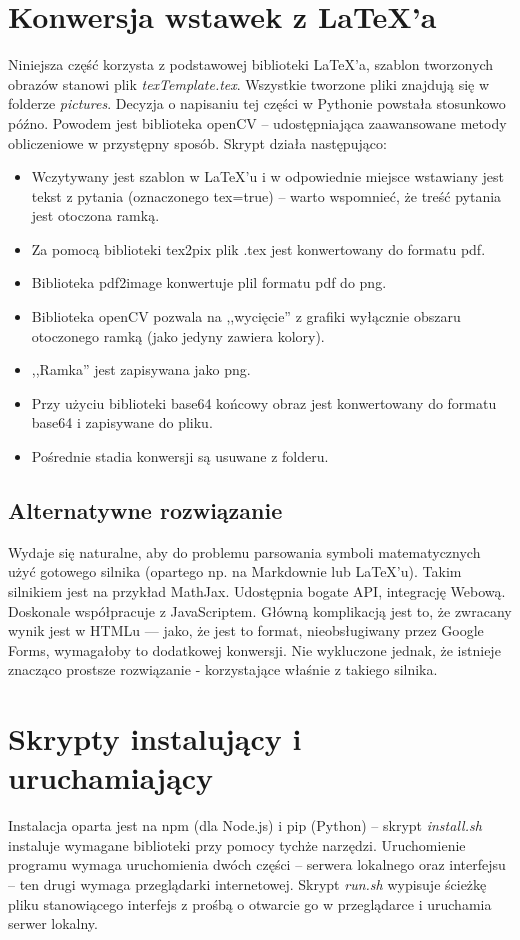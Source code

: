 \section{Konwersja wstawek z \LaTeX{}'a}
Niniejsza część korzysta z podstawowej biblioteki \LaTeX{}'a, szablon tworzonych obrazów stanowi plik \textit{texTemplate.tex}. Wszystkie tworzone pliki znajdują się w folderze \textit{pictures}.
\ind Decyzja o napisaniu tej części w Pythonie powstała stosunkowo późno. Powodem jest biblioteka openCV -- udostępniająca zaawansowane metody obliczeniowe w przystępny sposób. Skrypt działa następująco:
\begin{itemize}
\item Wczytywany jest szablon w \LaTeX{}'u i w odpowiednie miejsce wstawiany jest tekst z pytania (oznaczonego tex=true) -- warto wspomnieć, że treść pytania jest otoczona ramką.
\item Za pomocą biblioteki tex2pix plik .tex jest konwertowany do formatu pdf.
\item Biblioteka pdf2image konwertuje plil formatu pdf do png.
\item Biblioteka openCV pozwala na ,,wycięcie'' z grafiki wyłącznie obszaru otoczonego ramką (jako jedyny zawiera kolory).
\item ,,Ramka'' jest zapisywana jako png.
\item Przy użyciu biblioteki base64 końcowy obraz jest konwertowany do formatu base64 i zapisywane do pliku.
\item Pośrednie stadia konwersji są usuwane z folderu.
\end{itemize}
\subsection{Alternatywne rozwiązanie}%
Wydaje się naturalne, aby do problemu parsowania symboli matematycznych użyć gotowego silnika (opartego np. na Markdownie lub \LaTeX{}'u). Takim silnikiem jest na przykład MathJax. Udostępnia bogate API, integrację Webową. Doskonale współpracuje z JavaScriptem. Główną komplikacją jest to, że zwracany wynik jest w HTMLu --- jako, że jest to format, nieobsługiwany przez Google Forms,  wymagałoby to dodatkowej konwersji. Nie wykluczone jednak, że istnieje znacząco prostsze rozwiązanie - korzystające właśnie z takiego silnika.
\section{Skrypty instalujący i uruchamiający}
Instalacja oparta jest na npm (dla Node.js) i pip (Python) -- skrypt \textit{install.sh} instaluje wymagane biblioteki przy pomocy tychże narzędzi.
\ind  Uruchomienie programu wymaga uruchomienia dwóch części -- serwera lokalnego oraz interfejsu -- ten drugi wymaga przeglądarki internetowej. Skrypt \textit{run.sh} wypisuje ścieżkę pliku stanowiącego interfejs z prośbą o otwarcie go w przeglądarce i uruchamia serwer lokalny.










